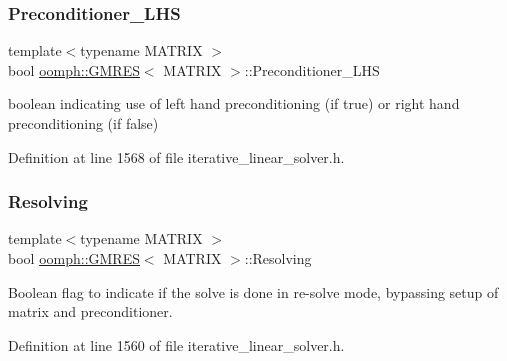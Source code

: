 \mbox{\label{classoomph_1_1GMRES_a19814405efef12cb87cf18b795e55fb4}} 
\subsubsection{\texorpdfstring{Preconditioner\+\_\+\+L\+HS}{Preconditioner\_LHS}}
{\footnotesize\ttfamily template$<$typename M\+A\+T\+R\+IX $>$ \\
bool \hyperlink{classoomph_1_1GMRES}{oomph\+::\+G\+M\+R\+ES}$<$ M\+A\+T\+R\+IX $>$\+::Preconditioner\+\_\+\+L\+HS\hspace{0.3cm}{\ttfamily [private]}}



boolean indicating use of left hand preconditioning (if true) or right hand preconditioning (if false) 



Definition at line 1568 of file iterative\+\_\+linear\+\_\+solver.\+h.

\mbox{\label{classoomph_1_1GMRES_a0f520f14d3c16894db4fded7e9dac4f2}} 
\subsubsection{\texorpdfstring{Resolving}{Resolving}}
{\footnotesize\ttfamily template$<$typename M\+A\+T\+R\+IX $>$ \\
bool \hyperlink{classoomph_1_1GMRES}{oomph\+::\+G\+M\+R\+ES}$<$ M\+A\+T\+R\+IX $>$\+::Resolving\hspace{0.3cm}{\ttfamily [private]}}



Boolean flag to indicate if the solve is done in re-\/solve mode, bypassing setup of matrix and preconditioner. 



Definition at line 1560 of file iterative\+\_\+linear\+\_\+solver.\+h.

\mbox{\label{classoomph_1_1GMRES_aa45a0faa6609689d44ac0df3dade8db1}} 
